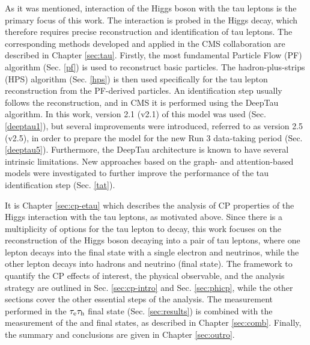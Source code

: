As it was mentioned, interaction of the Higgs boson with the tau leptons is the primary focus of this work. The interaction is probed in the Higgs decay, which therefore requires precise reconstruction and identification of tau leptons. The corresponding methods developed and applied in the CMS collaboration are described in Chapter \ref{sec:tau}. Firstly, the most fundamental Particle Flow (PF) algorithm (Sec. \ref{pf}) is used to reconstruct basic particles. The hadron-plus-strips (HPS) algorithm (Sec. \ref{hps}) is then used specifically for the tau lepton reconstruction from the PF-derived particles. An identification step usually follows the reconstruction, and in CMS it is performed using the DeepTau algorithm. In this work, version 2.1 (v2.1) of this model was used (Sec. \ref{deeptau1}), but several improvements were introduced, referred to as version 2.5 (v2.5), in order to prepare the model for the new Run 3 data-taking period (Sec. \ref{deeptau5}). Furthermore, the DeepTau architecture is known to have several intrinsic limitations. New approaches based on the graph- and attention-based models were investigated to further improve the performance of the tau identification step (Sec. \ref{tat}).

It is Chapter \ref{sec:cp-etau} which describes the analysis of CP properties of the Higgs interaction with the tau leptons, as motivated above. Since there is a multiplicity of options for the tau lepton to decay, this work focuses on the reconstruction of the Higgs boson decaying into a pair of tau leptons, where one lepton decays into the final state with a single electron and neutrinos, while the other lepton decays into hadrons and neutrino (\et final state). The framework to quantify the CP effects of interest, the physical observable, and the analysis strategy are outlined in Sec. \ref{sec:cp-intro} and Sec. \ref{sec:phicp}, while the other sections cover the other essential steps of the analysis. The measurement performed in the $\tau_\mathrm{e}\tau_\mathrm{h}$ final state (Sec. \ref{sec:results}) is combined with the measurement of the \mt and \tata final states, as described in Chapter \ref{sec:comb}. Finally, the summary and conclusions are given in Chapter \ref{sec:outro}.

